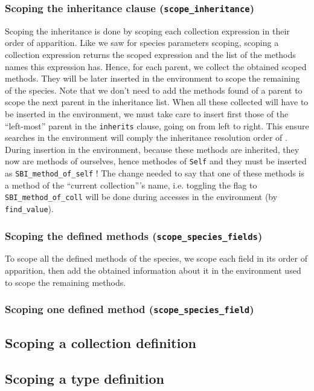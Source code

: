 \subsubsection{Scoping the inheritance clause ({\tt scope\_inheritance})}
Scoping the inheritance is done by scoping each collection expression
in their order of apparition. Like we saw for species parameters
scoping, scoping a collection expression returns the scoped expression
and the list of the methods names this expression has.
Hence, for each parent, we collect the obtained scoped methods. They
will be later inserted in the environment to scope the remaining of
the species. Note that we don't need to add the methods found of a
parent to scope the next parent in the inheritance list. When all
these collected will have to be inserted in the environment, we must
take care to insert first those of the ``left-most'' parent in the
{\tt inherits} clause, going on from left to right. This ensure
searches in the environment will comply the inheritance resolution
order of \focalize. During insertion in the environment, because these
methods are inherited, they now are methods of ourselves, hence
methodes of {\tt Self} and they must be inserted as
{\tt SBI\_method\_of\_self} ! The change needed to say that one of
these methods is a method of the ``current collection'''s name,
i.e. toggling the flag to {\tt SBI\_method\_of\_coll} will be done
during accesses in the environment (by {\tt find\_value}).


\subsubsection{Scoping the defined methods ({\tt scope\_species\_fields})}
To scope all the defined methods of the species, we scope each field
in its order of apparition, then add the obtained information about it
in the environment used to scope the remaining methods.


\subsubsection{Scoping one defined method ({\tt scope\_species\_field})}


\subsection{Scoping a collection definition}

\subsection{Scoping a type definition}

